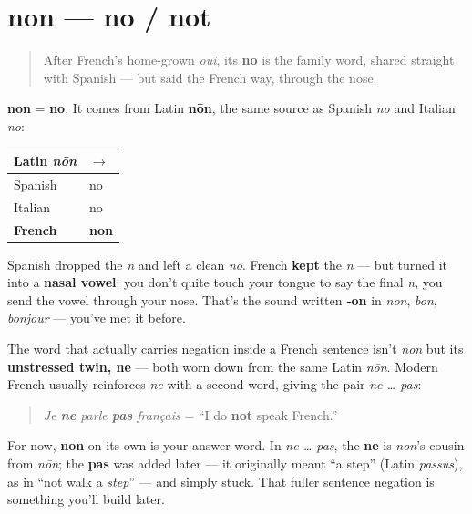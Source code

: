 \section[non]{non — no / not}

\label{lesson:FR-C18-non}



\begin{quote}
After French's home-grown \emph{oui}, its \textbf{no} is the family word, shared straight with Spanish — but said the French way, through the nose.
\end{quote}

\begin{cousinweb}
\textbf{non} = \textbf{no}. It comes from Latin \textbf{nōn}, the same source as Spanish \emph{no} and Italian \emph{no}:

\noindent
\begin{tabularx}{\linewidth}{@{}>{\raggedright\arraybackslash}X>{\raggedright\arraybackslash}X@{}}
\toprule
\textbf{Latin \emph{nōn}} & \textbf{$\to$} \\
\midrule
Spanish & no \\
Italian & no \\
\textbf{French} & \textbf{non} \\
\bottomrule
\end{tabularx}

Spanish dropped the \emph{n} and left a clean \emph{no}. French \textbf{kept} the \emph{n} — but turned it into a \textbf{nasal vowel}: you don't quite touch your tongue to say the final \emph{n}, you send the vowel through your nose. That's the sound written \textbf{‑on} in \emph{non}, \emph{bon}, \emph{bonjour} — you've met it before.
\end{cousinweb}

\begin{grammarlens}[title={Grammar Lens: The seed of French negation}]
The word that actually carries negation inside a French sentence isn't \emph{non} but its \textbf{unstressed twin, ne} — both worn down from the same Latin \emph{nōn}. Modern French usually reinforces \emph{ne} with a second word, giving the pair \emph{ne … pas}:

\begin{quote}
\emph{Je \textbf{ne} parle \textbf{pas} français} = \textquotedblleft{}I do \textbf{not} speak French.\textquotedblright{}
\end{quote}

For now, \textbf{non} on its own is your answer-word. In \emph{ne … pas}, the \textbf{ne} is \emph{non}'s cousin from \emph{nōn}; the \textbf{pas} was added later — it originally meant \textquotedblleft{}a step\textquotedblright{} (Latin \emph{passus}), as in \textquotedblleft{}not walk a \emph{step}\textquotedblright{} — and simply stuck. That fuller sentence negation is something you'll build later.
\end{grammarlens}

